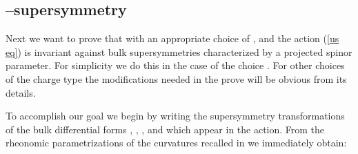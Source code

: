 \documentclass[a4paper,11pt]{article}
\def\tilde{\widetilde}
\begin{document}
\subsection{\myHighlight{$\kappa$}\coordHE{}--supersymmetry}
Next we want to prove that with an appropriate choice of \coordHE{}, \coordHE{} and \coordHE{} the action (\ref{us eq}) is invariant against bulk
supersymmetries characterized by a projected spinor parameter. For
simplicity we do this in the case of the choice \myHighlight{$\tilde{q}_{\alpha} = q_{\alpha}  = \frac{1}{\sqrt{2}}(1 \, , \,
1)$}\coordHE{}. For other choices of the charge type the modifications needed in
the prove will be obvious from its details.
\par
To accomplish our goal we begin by writing the supersymmetry transformations of the
bulk differential forms \coordHE{}, \coordHE{}, \coordHE{},
\coordHE{} and \coordHE{} which appear in the action. From the rheonomic
parametrizations of the curvatures recalled in \cite{noidued3} we immediately
obtain:
\end{document}
